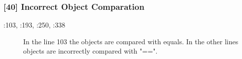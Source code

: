 \subsubsection{[40] Incorrect Object Comparation}
\begin{description}
	\item[:103, :193, :250, :338] In the line 103 the objects are compared with equals. In the other lines objects are incorrectly compared with "==". 
\end{description}